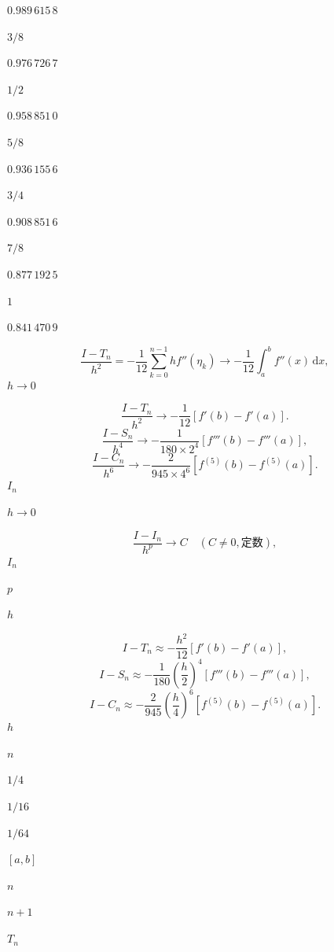 \documentclass[UTF8,fontset=fandol]{ctexart}
\begin{document}
$0.989\,615\,8$\par
$3/8$\par
$0.976\,726\,7$\par
$1/2$\par
$0.958\,851\,0$\par
$5/8$\par
$0.936\,155\,6$\par
$3/4$\par
$0.908\,851\,6$\par
$7/8$\par
$0.877\,192\,5$\par
$1$\par
$0.841\,470\,9$\par
\[ 
\frac{I-T_n}{h^2}=-\frac1{12}\sum_{k=0}^{n-1}hf''(\eta_k)\to-\frac1{12}\int_a^b f''(x)\,\mathrm{d}x,
 \]
$h\to0$\par
\[ 
\frac{I-T_n}{h^2}\to-\frac1{12}[f'(b)-f'(a)].
 \]
\[ 
\frac{I-S_n}{h^4}\to-\frac1{180\times2^4}[f'''(b)-f'''(a)],
 \]
\[ 
\frac{I-C_n}{h^6}\to-\frac2{945\times4^6}[f^{(5)}(b)-f^{(5)}(a)].
 \]
$I_n$\par
$h\to0$\par
\[ 
\frac{I-I_n}{h^p}\to C\quad(C\ne0,\text{定数}),
 \]
$I_n$\par
$p$\par
$h$\par
\[ 
I-T_n\approx-\frac{h^2}{12}[f'(b)-f'(a)],
\tag{4.2.15}
 \]
\[ 
I-S_n\approx-\frac1{180}\left(\frac h2\right)^4[f'''(b)-f'''(a)],
\tag{4.2.16}
 \]
\[ 
I-C_n\approx-\frac2{945}\left(\frac h4\right)^6[f^{(5)}(b)-f^{(5)}(a)].
\tag{4.2.17}
 \]
$h$\par
$n$\par
$1/4$\par
$1/16$\par
$1/64$\par
$[a,b]$\par
$n$\par
$n+1$\par
$T_n$\par
\end{document}
